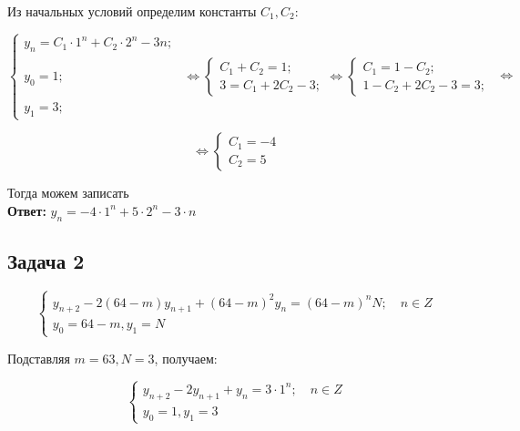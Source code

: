 \documentclass[14pt,a4paper]{scrartcl}
\begin{document}
Из начальных условий определим константы $C_1, C_2$:

\begin{equation*}
	\left\{\begin{array}{ll}
	y_{n}=C_{1} \cdot 1^{n}+C_{2} \cdot 2^{n}-3 n ; & \\
	y_{0}=1 ; & \Leftrightarrow\left\{\begin{array}{l}
	C_{1}+C_{2}=1 ; \\
	3 = C_{1}+2 C_{2}-3 ;
	\end{array} \Leftrightarrow\left\{\begin{array}{l}
	C_{1}=1-C_{2}; \\
	1-C_{2}+2 C_{2}-3=3;
	\end{array}\right.\right. \\
	y_{1}=3 ;
	\end{array}\right. \Leftrightarrow
\end{equation*}


\begin{equation*}
	\Leftrightarrow \left\{\begin{array}{l}
	C_{1}=-4 \\
	C_{2}=5
	\end{array}\right.
\end{equation*}

Тогда можем записать\\
\textbf{Ответ:} $y_n=-4\cdot1^n+5\cdot2^n-3\cdot n$
\subsection*{Задача 2}

\begin{equation*}
	\left\{\begin{array}{l}
	y_{n+2}-2(64-m) y_{n+1}+(64-m)^{2} y_{n}=(64-m)^{n} N ; \quad n \in Z \\
	y_{0}=64-m, y_{1}=N
	\end{array}\right.
\end{equation*}

Подставляя $m=63, N=3$, получаем:

\begin{equation*}
	\left\{\begin{array}{l}
	y_{n+2}-2 y_{n+1}+y_{n}=3\cdot1^{n} ; \quad n \in Z \\
	y_{0}=1, y_{1}=3
	\end{array}\right.
\end{equation*}
\end{document}
